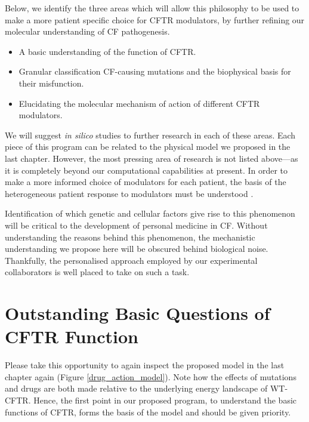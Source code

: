 Below, we identify the three areas which will allow this philosophy to be used to make a more patient specific choice for CFTR modulators, by further refining our molecular understanding of CF pathogenesis.

\begin{itemize}
	\item A basic understanding of the function of CFTR.
	\item Granular classification CF-causing mutations and the biophysical basis for their misfunction.
	\item Elucidating the molecular mechanism of action of different CFTR modulators. 
\end{itemize}

We will suggest \textit{in silico} studies to further research in each of these areas. Each piece of this program can be related to the physical model we proposed in the last chapter. However, the most pressing area of research is not listed above---as it is completely beyond our computational capabilities at present. In order to make a more informed choice of modulators for each patient, the basis of the heterogeneous patient response to modulators must be understood \cite{hanafin2021}. 

Identification of which genetic and cellular factors give rise to this phenomenon will be critical to the development of personal medicine in CF. Without understanding the reasons behind this phenomenon, the mechanistic understanding we propose here will be obscured behind biological noise. Thankfully, the personalised approach employed by our experimental collaborators is well placed to take on such a task.

\section{Outstanding Basic Questions of CFTR Function}

Please take this opportunity to again inspect the proposed model in the last chapter again (Figure \ref{drug_action_model}). Note how the effects of mutations and drugs are both made relative to the underlying energy landscape of WT-CFTR. Hence, the first point in our proposed program, to understand the basic functions of CFTR, forms the basis of the model and should be given priority.


